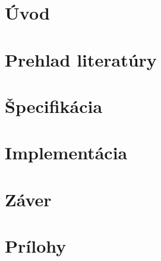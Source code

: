 \chapter{Úvod}


\chapter{Prehlad literatúry}


\chapter{Špecifikácia}


\chapter{Implementácia}


\chapter{Záver}

\printbibliography
{}  %


\chapter*{Prílohy}   %

